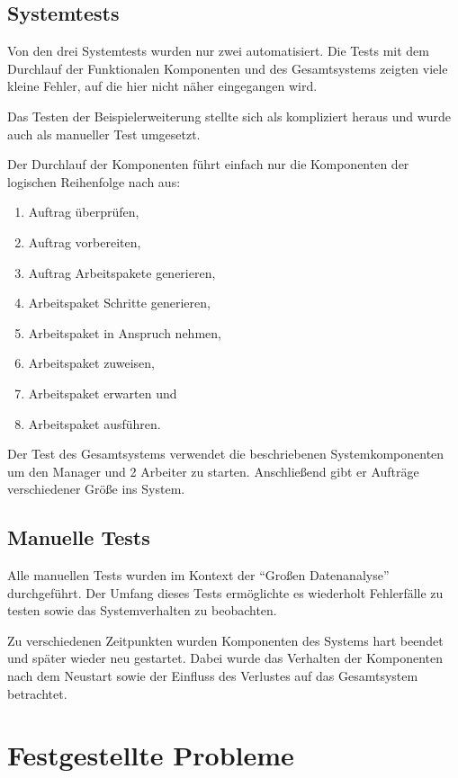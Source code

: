 \subsection{Systemtests}

Von den drei Systemtests wurden nur zwei automatisiert.
Die Tests mit dem Durchlauf der Funktionalen Komponenten und des Gesamtsystems
zeigten viele kleine Fehler, auf die hier nicht näher eingegangen wird.

Das Testen der Beispielerweiterung stellte sich als kompliziert heraus und wurde auch als manueller Test umgesetzt.

Der Durchlauf der Komponenten führt einfach nur die Komponenten der logischen Reihenfolge nach aus:
\begin{enumerate}
    \item Auftrag überprüfen,
    \item Auftrag vorbereiten,
    \item Auftrag Arbeitspakete generieren,
    \item Arbeitspaket Schritte generieren,
    \item Arbeitspaket in Anspruch nehmen,
    \item Arbeitspaket zuweisen,
    \item Arbeitspaket erwarten und
    \item Arbeitspaket ausführen.
\end{enumerate}

Der Test des Gesamtsystems verwendet die beschriebenen Systemkomponenten um den Manager und 2 Arbeiter zu starten.
Anschließend gibt er Aufträge verschiedener Größe ins System.

\subsection{Manuelle Tests}

Alle manuellen Tests wurden im Kontext der ``Großen Datenanalyse'' durchgeführt.
Der Umfang dieses Tests ermöglichte es wiederholt Fehlerfälle zu testen sowie das Systemverhalten zu beobachten.

Zu verschiedenen Zeitpunkten wurden Komponenten des Systems hart beendet und später wieder neu gestartet.
Dabei wurde das Verhalten der Komponenten nach dem Neustart
 sowie der Einfluss des Verlustes auf das Gesamtsystem betrachtet.


\section{Festgestellte Probleme}
\label{sec:eval:probleme}

